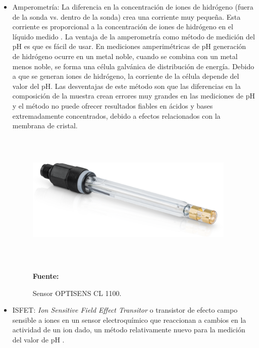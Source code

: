\begin{itemize}
    \item Amperometr\'ia: La diferencia en la concentraci\'on de iones de hidr\'ogeno (fuera de la sonda vs. dentro de la sonda) crea una corriente muy pequeña. 
    Esta corriente es proporcional a la concentraci\'on de iones de hidr\'ogeno en el l\'iquido medido \cite{Atlas_pH}. 
    La ventaja de la amperometría como m\'etodo de medici\'on del pH es que es f\'acil de usar. 
    En mediciones amperim\'etricas de pH generaci\'on de hidr\'ogeno ocurre en un metal noble, cuando se combina con un metal menos noble, se forma una c\'elula galv\'anica de distribuci\'on de energ\'ia. 
    Debido a que se generan iones de hidr\'ogeno, la corriente de la c\'elula depende del valor del pH. 
    Las desventajas de este m\'etodo son que las diferencias en la composici\'on de la muestra crean errores muy grandes en las mediciones de pH y el m\'etodo no puede ofrecer resultados fiables en \'acidos y bases extremadamente concentrados, debido a efectos relacionados con la membrana de cristal. 
    \\
    \begin{figure}[ht]
        \centering
        \caption {Sensor OPTISENS CL 1100.}
        \includegraphics[width=100mm, height=65mm]{Imagenes/cap2/amperimetrico.png}
        
        \textbf{Fuente:} \cite{ampe_sensores_nodate} 
        \label{fig:amperimetrica}
    \end{figure}
    
    \item ISFET: \textit{Ion Sensitive Field Effect Transitor} o transistor de efecto campo sensible a iones en un sensor electroqu\'imico que reaccionan a cambios en la actividad de un ion dado, un m\'etodo relativamente nuevo para la medici\'on del valor de pH \cite{duroux_ion_1991}.
    

\end{itemize}
